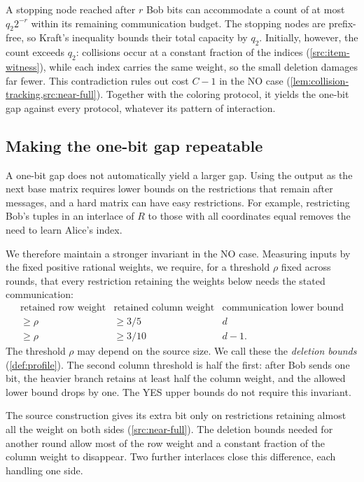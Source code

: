 \documentclass[11pt,letterpaper]{article} \usepackage[utf8]{inputenc}
\theoremstyle{plain} \newtheorem{theorem}{Theorem}[section]
\theoremstyle{definition} \newaliascnt{definition}{theorem}
\begin{document}
A stopping node reached after $r$ Bob bits can accommodate a count of at
most $q_2 2^{-r}$ within its remaining communication budget. The stopping
nodes are prefix-free, so Kraft's inequality bounds their total capacity
by $q_2$. Initially, however, the count exceeds $q_2$: collisions occur
at a constant fraction of the indices (\cref{src:item-witness}), while
each index carries the same weight, so the small deletion damages far fewer. This contradiction
rules out cost $C-1$ in the NO case
(\cref{lem:collision-tracking,src:near-full}). Together with the coloring
protocol, it yields the one-bit gap against every protocol, whatever
its pattern of interaction.

\subsection{Making the one-bit gap repeatable}

A one-bit gap does not automatically yield a larger gap. Using the output
as the next base matrix requires lower bounds on the restrictions that
remain after messages, and a hard matrix can have easy restrictions.
For example, restricting Bob's tuples in an interlace of $R$ to those
with all coordinates equal removes the need to learn Alice's index.

We therefore maintain a stronger invariant in the NO case. Measuring
inputs by the fixed positive rational weights, we require, for a
threshold $\rho$ fixed across rounds, that every restriction retaining
the weights below needs the stated communication:
\[
\begin{array}{c|c|c}
\text{retained row weight}&\text{retained column weight}
   &\text{communication lower bound}\\ \hline
\ge\rho&\ge3/5&d\\
\ge\rho&\ge3/10&d-1 .
\end{array}
\]
The threshold $\rho$ may depend on the source size. We call these the
\emph{deletion bounds} (\cref{def:profile}). The second column threshold
is half the first: after Bob sends one bit, the heavier branch retains
at least half the column weight, and the allowed lower bound drops by
one. The YES upper bounds do not require this invariant.

The source construction gives its extra bit only on restrictions
retaining almost all the weight on both sides (\cref{src:near-full}).
The deletion bounds needed for another round allow most of the row
weight and a constant fraction of the column weight to disappear. Two further
interlaces close this difference, each handling one side.
\end{document}
